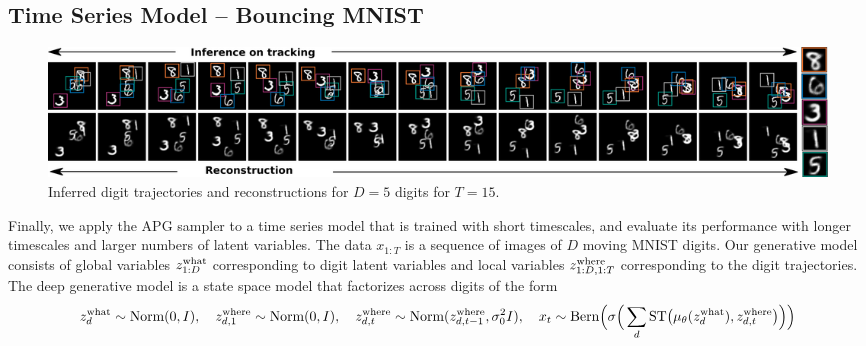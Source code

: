 \documentclass[anonymous=false, %
               format=acmsmall, %
               review=true, %
               screen=true, %
               nonacm=true]{acmart}
\theoremstyle{definition}
\begin{document}
\subsection{Time Series Model -- Bouncing MNIST}
\begin{figure}[!t]
  \centering
  \includegraphics[width=1.0\textwidth]{figures/bmnist-5digits-samples.pdf}
  \vspace{-2.0em}
  \caption{Inferred digit trajectories and reconstructions for $D = 5$ digits for $T = 15$.}
  \label{mnist-qualitative}
\end{figure}
Finally, we apply the APG sampler to a time series model that is trained with short timescales, and evaluate its performance with longer timescales and larger numbers of latent variables.
The data $x_{1:T}$ is a sequence of images of $D$ moving MNIST digits.
Our generative model consists of global variables $z_{1:D}^{\mathrm{what}}$ corresponding to digit latent variables and local variables $z_{1:D, 1:T}^{\mathrm{where}}$ corresponding to the digit trajectories.
The deep generative model is a state space model that factorizes across digits of the form
{\footnotesize
\begin{align*}
    z^{\mathrm{what}}_{d} 
    \sim 
    \text{Norm}(0, I)
    ,
    \quad
    z^{\mathrm{where}}_{d, 1} \sim \text{Norm}(0, I)
    , 
    \quad
    z^{\mathrm{where}}_{d, t} 
    \sim 
    \text{Norm}(z^{\mathrm{where}}_{d, t - 1}, \sigma^2_0 I) 
    ,
    \quad
    x_t 
    \sim
    \mathrm{Bern}
    \Big(
        \sigma
        \Big(
            \sum_{d} \mathrm{ST}
            \big(
                \mu_\theta(z^{\mathrm{what}}_d), 
                z^{\mathrm{where}}_{d, t}
            \big)
        \Big)
    \Big)
\end{align*}
}%
\end{document}

